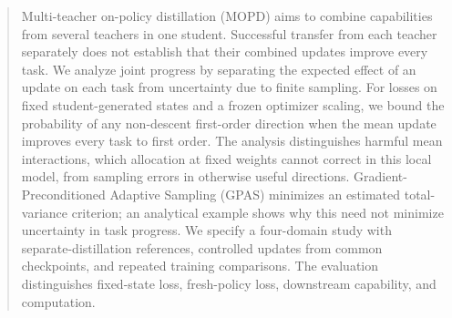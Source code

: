 \begin{abstract}
Multi-teacher on-policy distillation (MOPD) aims to combine capabilities
from several teachers in one student. Successful transfer from each teacher
separately does not establish that their combined updates improve every
task. We analyze joint progress by separating the expected effect of an
update on each task from uncertainty due to finite sampling. For losses on
fixed student-generated states and a frozen optimizer scaling, we bound the
probability of any non-descent first-order direction when the mean update
improves every task to first order. The analysis distinguishes harmful mean
interactions, which allocation at fixed weights cannot correct in this local
model, from sampling errors in otherwise useful directions.
Gradient-Preconditioned Adaptive Sampling (GPAS) minimizes an estimated
total-variance criterion; an
analytical example shows why this need not minimize uncertainty in task
progress. We specify a four-domain study with separate-distillation
references, controlled updates from common checkpoints, and repeated
training comparisons. The evaluation distinguishes fixed-state loss,
fresh-policy loss, downstream capability, and computation.
\end{abstract}
